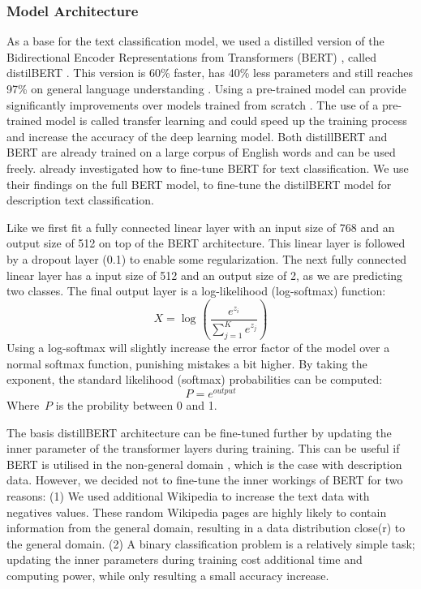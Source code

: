 \documentclass[a4paper, 12pt, oneside]{book} %
\begin{document}
\subsubsection{Model Architecture} \label{par:Architecture}
As a base for the text classification model, we used a distilled version of the Bidirectional Encoder Representations from Transformers (BERT) \autocite{devlin_bert_2019}, called distilBERT \autocite{sanh_distilbert_2020}. 
This version is 60\% faster, has 40\% less parameters and still reaches 97\% on general language understanding \autocite{sanh_distilbert_2020}.
Using a pre-trained model can provide significantly improvements over models trained from scratch \autocite{mikolov_distributed_2013}.
The use of a pre-trained model is called transfer learning and could speed up the training process and increase the accuracy of the deep learning model.
Both distillBERT and BERT are already trained on a large corpus of English words and can be used freely.
\textcite{sun_how_2020} already investigated how to fine-tune BERT for text classification.
We use their findings on the full BERT model, to fine-tune the distilBERT model for description text classification.

Like \textcite{sun_how_2020} we first fit a fully connected linear layer with an input size of 768 and an output size of 512 on top of the BERT architecture. 
This linear layer is followed by a dropout layer (0.1) to enable some regularization.
The next fully connected linear layer has a input size of 512 and an output size of 2, as we are predicting two classes.
The final output layer is a log-likelihood (log-softmax) function:
\begin{equation} \label{eq:logsoftmax}
    X = \log_{}(\frac{e^{z_i}}{\sum_{j=1}^K e^{z_j}})
\end{equation}
Using a log-softmax will slightly increase the error factor of the model over a normal softmax function, punishing mistakes a bit higher.
By taking the exponent, the standard likelihood (softmax) probabilities can be computed:
\begin{equation}
    P = e^{output} 
\end{equation}
Where~$P$ is the probility between 0 and 1.

The basis distillBERT architecture can be fine-tuned further by updating the inner parameter of the transformer layers during training. 
This can be useful if BERT is utilised in the non-general domain \autocite{devlin_bert_2019, sun_how_2020, sanh_distilbert_2020}, which is the case with description data.
However, we decided not to fine-tune the inner workings of BERT for two reasons: 
(1) We used additional Wikipedia to increase the text data with negatives values.
These random Wikipedia pages are highly likely to contain information from the general
domain, resulting in a  data distribution close(r) to the general domain.
(2) A binary classification problem is a relatively simple task; updating the inner parameters during training cost additional time and computing power, while only resulting a small accuracy increase.
\end{document}
